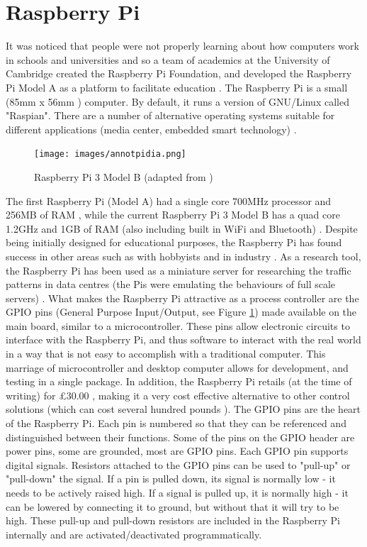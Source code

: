 \documentclass[twoside,a4]{report}
\def\br{\newline \newline \noindent}
\begin{document}
	\section*{Raspberry Pi}
	It was noticed that people were not properly learning about how computers work in schools and universities and so a team of academics at the University of Cambridge created the Raspberry Pi Foundation, and developed the Raspberry Pi Model A as a platform to facilitate education \cite{pihistory}. The Raspberry Pi is a small (85mm x 56mm \cite{pi3mechdraw}) computer. By default, it runs a version of GNU/Linux called "Raspian". There are a number of alternative operating systems suitable for different applications (media center, embedded smart technology) \cite{piotheros}.  \newline
	\begin{figure}[!htb]
		\centering
		\texttt{[image: images/annotpidia.png]} %
		\caption{Raspberry Pi 3 Model B (adapted from  \cite{pi3info})}
		\label{pidia}
	\end{figure} \newline%
	The first Raspberry Pi (Model A) had a single core 700MHz processor and 256MB of RAM \cite{pi1info}, while the current Raspberry Pi 3 Model B has a quad core 1.2GHz and 1GB of RAM (also including built in WiFi and Bluetooth) \cite{pi3info}. 
	\br
	Despite being initially designed for educational purposes, the Raspberry Pi has found success in other areas such as with hobbyists \cite{pihobbynotedu} and in industry \cite{pimorethanedu}. As a research tool, the Raspberry Pi has been used as a miniature server for researching the traffic patterns in data centres (the Pis were emulating the behaviours of full scale servers) \cite{piglasgowdc}.
	\br
	What makes the Raspberry Pi attractive as a process controller are the GPIO pins (General Purpose Input/Output, see Figure \ref{pidia}) made available on the main board, similar to a microcontroller. These pins allow electronic circuits to interface with the Raspberry Pi, and thus software to interact with the real world in a way that is not easy to accomplish with a traditional computer. This marriage of microcontroller and desktop computer allows for development, and testing in a single package. In addition, the Raspberry Pi retails (at the time of writing) for \pounds 30.00 \cite{picost}, making it a very cost effective alternative to other control solutions (which can cost several hundred pounds \cite{otherpcucost}). 
	\br
	The GPIO pins are the heart of the Raspberry Pi. Each pin is numbered so that they can be referenced and distinguished between their functions. Some of the pins on the GPIO header are power pins, some are grounded, most are GPIO pins. Each GPIO pin supports digital signals. Resistors attached to the GPIO pins can be used to "pull-up" or "pull-down" the signal. If a pin is pulled down, its signal is normally low - it needs to be actively raised high. If a signal is pulled up, it is normally high - it can be lowered by connecting it to ground, but without that it will try to be high. These pull-up and pull-down resistors are included in the Raspberry Pi internally and are activated/deactivated programmatically.
	
\end{document}
